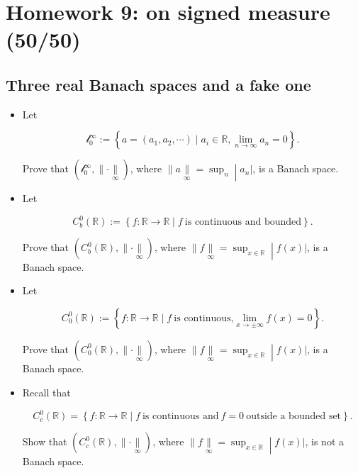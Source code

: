 \chapter{Homework 9: on signed measure (50/50)}\label{homework-9-on-signed-measure-5050}

\section{Three real Banach spaces and a fake one}\label{three-real-banach-spaces-and-a-fake-one}

\begin{itemize}
\item
  Let

  \[\mathcal{l}_{0}^{\infty} := \left\{ {a = (a_{1},a_{2},\cdots) \mid a_{i} \in \mathbb{R},\lim\limits_{n\rightarrow\infty}a_{n} = 0} \right\}.\]

  Prove that \((\mathcal{l}_{0}^{\infty}, \parallel \cdot \underset{\infty}{\parallel})\), where \(\left. \parallel a\underset{\infty}{\parallel} = \sup_{n} \middle| a_{n}| \right.\), is a Banach space.
\item
  Let

  \[C_{b}^{0}(\mathbb{R}) := \left\{ {f:\mathbb{R}\rightarrow\mathbb{R} \mid f\ \text{is continuous and bounded}} \right\}.\]

  Prove that \((C_{b}^{0}(\mathbb{R}), \parallel \cdot \underset{\infty}{\parallel})\), where \(\left. \parallel f\underset{\infty}{\parallel} = \sup_{x \in \mathbb{R}} \middle| f(x)| \right.\), is a Banach space.
\item
  Let

  \[C_{0}^{0}(\mathbb{R}) := \left\{ {f:\mathbb{R}\rightarrow\mathbb{R} \mid f\ \text{is continuous,}\lim\limits_{x\rightarrow \pm \infty}f(x) = 0} \right\}.\]

  Prove that \((C_{0}^{0}(\mathbb{R}), \parallel \cdot \underset{\infty}{\parallel})\), where \(\left. \parallel f\underset{\infty}{\parallel} = \sup_{x \in \mathbb{R}} \middle| f(x)| \right.\), is a Banach space.
\item
  Recall that

  \[C_{c}^{0}(\mathbb{R}) = \left\{ {f:\mathbb{R}\rightarrow\mathbb{R} \mid f\ \text{is continuous and}\ f = 0\ \text{outside a bounded set}} \right\}.\]

  Show that \((C_{c}^{0}(\mathbb{R}), \parallel \cdot \underset{\infty}{\parallel})\), where \(\left. \parallel f\underset{\infty}{\parallel} = \sup_{x \in \mathbb{R}} \middle| f(x)| \right.\), is not a Banach space.
\end{itemize}

